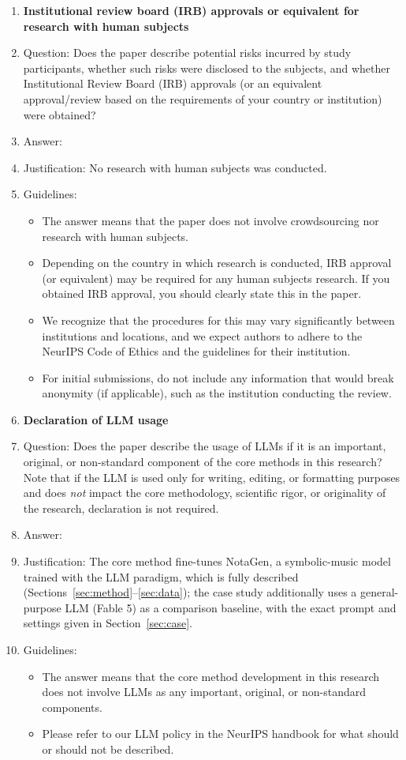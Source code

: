 \documentclass{article}
\begin{document}
\begin{enumerate}
\item {\bf Institutional review board (IRB) approvals or equivalent for research with human subjects}
    \item[] Question: Does the paper describe potential risks incurred by study participants, whether such risks were disclosed to the subjects, and whether Institutional Review Board (IRB) approvals (or an equivalent approval/review based on the requirements of your country or institution) were obtained?
    \item[] Answer: \answerNA{}
    \item[] Justification: No research with human subjects was conducted.
    \item[] Guidelines:
    \begin{itemize}
        \item The answer \answerNA{} means that the paper does not involve crowdsourcing nor research with human subjects.
        \item Depending on the country in which research is conducted, IRB approval (or equivalent) may be required for any human subjects research. If you obtained IRB approval, you should clearly state this in the paper. 
        \item We recognize that the procedures for this may vary significantly between institutions and locations, and we expect authors to adhere to the NeurIPS Code of Ethics and the guidelines for their institution. 
        \item For initial submissions, do not include any information that would break anonymity (if applicable), such as the institution conducting the review.
    \end{itemize}

\item {\bf Declaration of LLM usage}
    \item[] Question: Does the paper describe the usage of LLMs if it is an important, original, or non-standard component of the core methods in this research? Note that if the LLM is used only for writing, editing, or formatting purposes and does \emph{not} impact the core methodology, scientific rigor, or originality of the research, declaration is not required.
    \item[] Answer: \answerYes{}
    \item[] Justification: The core method fine-tunes NotaGen, a symbolic-music model trained with the LLM paradigm, which is fully described (Sections~\ref{sec:method}--\ref{sec:data}); the case study additionally uses a general-purpose LLM (Fable 5) as a comparison baseline, with the exact prompt and settings given in Section~\ref{sec:case}.
    \item[] Guidelines:
    \begin{itemize}
        \item The answer \answerNA{} means that the core method development in this research does not involve LLMs as any important, original, or non-standard components.
        \item Please refer to our LLM policy in the NeurIPS handbook for what should or should not be described.
    \end{itemize}

\end{enumerate}
\end{document}
